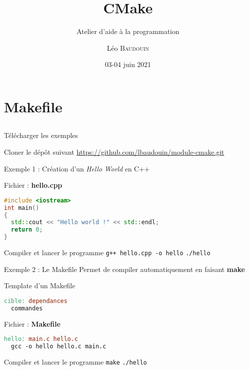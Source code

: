 \documentclass{beamer}
\title{CMake}
\subtitle{Atelier d'aide à la programmation}
\author{L\'eo \textsc{Baudouin}}
\institute{
  {\url{baudouin.leo @ gmail.com}}
}
\date{03-04 juin 2021}
\begin{document}
\begin{frame}
  \titlepage
\end{frame}

\section{Makefile}
\subsection{}

\begin{frame}[fragile]{Télécharger les exemples}
  \begin{block}{Cloner le dép\^ot suivant}
    \url{https://github.com/lbaudouin/module-cmake.git}
  \end{block}
\end{frame}

\begin{frame}[fragile]{Exemple 1 : Création d'un \textit{Hello World} en C++}

  \begin{block}{Fichier : \textbf{hello.cpp}}
  \begin{lstlisting}[language=C++]
#include <iostream>
int main()
{
  std::cout << "Hello world !" << std::endl;
  return 0;
}
\end{lstlisting}
  \end{block}
  \pause

  \begin{block}{Compiler et lancer le programme}
    \textcolor{commandcolor}{\verb?g++ hello.cpp -o hello?}\linebreak
    \textcolor{commandcolor}{\verb?./hello?}
  \end{block}

\end{frame}

\begin{frame}[fragile]{Exemple 2 : Le Makefile}
  Permet de compiler automatiquement en faisant \textbf{make}

  \begin{exampleblock}{Template d'un Makefile}
  \begin{lstlisting}[language=make]
cible: dependances
  commandes
\end{lstlisting}
  \end{exampleblock}
  \pause

  \begin{block}{Fichier : \textbf{Makefile}}
  \begin{lstlisting}[language=make]
hello: main.c hello.c
  gcc -o hello hello.c main.c
\end{lstlisting}
  \end{block}
  \pause

  \begin{block}{Compiler et lancer le programme}
    \textcolor{commandcolor}{\verb?make?}\linebreak
    \textcolor{commandcolor}{\verb?./hello?}
  \end{block}
  
\end{frame}
\end{document}
